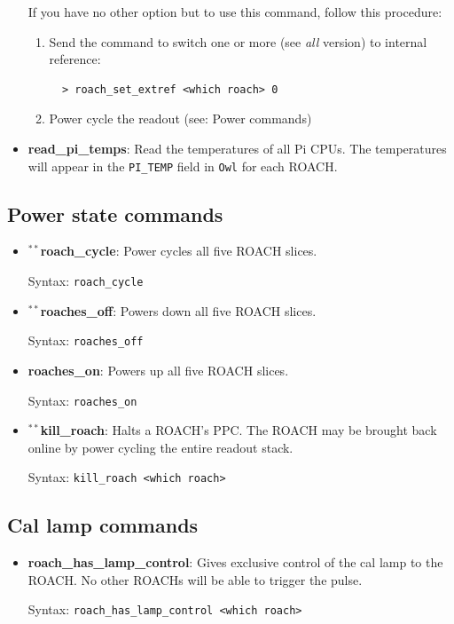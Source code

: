 \begin{itemize}[leftmargin=*,label={}]
If you have no other option but to use this command, follow this procedure:
\begin{enumerate}
  \item Send the command to switch one or more (see \textit{all} version) to internal reference:
\begin{verbatim}
  > roach_set_extref <which roach> 0
\end{verbatim}
  \item Power cycle the readout (see: Power commands)
\end{enumerate}

\item \textbf{read\_pi\_temps}: Read the temperatures of all Pi CPUs. The temperatures will appear in the \texttt{PI\_TEMP} field in \texttt{Owl} for each ROACH\@.

\end{itemize}

\subsection{Power state commands}

\begin{itemize}[leftmargin=*,label={}]

\item $^{**}$\textbf{roach\_cycle}: Power cycles all five ROACH slices.

Syntax: \texttt{roach\_cycle}

\item $^{**}$\textbf{roaches\_off}: Powers down all five ROACH slices.

Syntax: \texttt{roaches\_off}

\item \textbf{roaches\_on}: Powers up all five ROACH slices.

Syntax: \texttt{roaches\_on}

\item $^{**}$\textbf{kill\_roach}: Halts a ROACH’s PPC\@. The ROACH may be brought back online by power cycling the entire readout stack.

Syntax: \texttt{kill\_roach <which roach>}

\end{itemize}

\subsection{Cal lamp commands}

\begin{itemize}[leftmargin=*,label={}]
\item \textbf{roach\_has\_lamp\_control}: Gives exclusive control of the cal lamp to the ROACH\@. No other ROACHs will be able to trigger the pulse.

Syntax: \texttt{roach\_has\_lamp\_control <which roach>}
\end{itemize}

